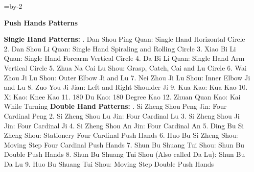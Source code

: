 \nopagenumbers
\pdfhorigin=1cm
\hsize=\pdfpagewidth \advance\hsize by-2\pdfhorigin
\centerline{\bf Push Hands Patterns}
\bigskip\bigskip\bigskip
\obeylines
{\bf Single Hand Patterns:}
. Dan Shou Ping Quan: Single Hand Horizontal Circle
2. Dan Shou Li Quan: Single Hand Spiraling and Rolling Circle
3. Xiao Bi Li Quan: Single Hand Forearm Vertical Circle
4. Da Bi Li Quan: Single Hand Arm Vertical Circle
5. Zhua Na Cai Lu Shou: Grasp, Catch, Cai and Lu Circle
6. Wai Zhou Ji Lu Shou: Outer Elbow Ji and Lu
7. Nei Zhou Ji Lu Shou: Inner Elbow Ji and Lu
8. Zuo You Ji Jian: Left and Right Shoulder Ji
9. Kua Kao: Kua Kao
10. Xi Kao: Knee Kao
11. 180 Du Kao: 180 Degree Kao
12. Zhuan Quan Kao: Kai While Turning
\bigskip
{\bf Double Hand Patterns:}
. Si Zheng Shou Peng Jin: Four Cardinal Peng
2. Si Zheng Shou Lu Jin: Four Cardinal Lu
3. Si Zheng Shou Ji Jin: Four Cardinal Ji
4. Si Zheng Shou An Jin: Four Cardinal An
5. Ding Bu Si Zheng Shou: Stationery Four Cardinal Push Hands
6. Huo Bu Si Zheng Shou: Moving Step Four Cardinal Push Hands
7. Shun Bu Shuang Tui Shou: Shun Bu Double Push Hands
8. Shun Bu Shuang Tui Shou (Also called Da Lu): Shun Bu Da Lu
9. Huo Bu Shuang Tui Shou: Moving Step Double Push Hands

\bye
